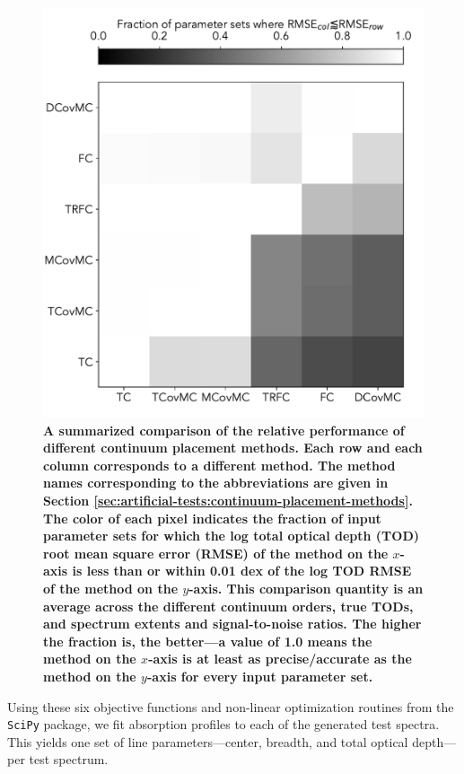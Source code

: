 \documentclass[trackchanges]{aastex62}
\begin{document}
{\begin{figure}
  \includegraphics[width=\linewidth]{figures/overall-performance.pdf}
  \caption{
  \bf \color{red}
  A summarized comparison of the relative performance of different continuum placement methods.
  Each row and each column corresponds to a different method.
  The method names corresponding to the abbreviations are given in Section \ref{sec:artificial-tests:continuum-placement-methods}.
  The color of each pixel indicates the fraction of input parameter sets for which the log total optical depth (TOD) root mean square error (RMSE) of the method on the $x$-axis is less than or within 0.01 dex of the log TOD RMSE of the method on the $y$-axis.
  This comparison quantity is an average across the different continuum orders, true TODs, and spectrum extents and signal-to-noise ratios.
  The higher the fraction is, the better---a value of 1.0 means the method on the $x$-axis is at least as precise/accurate as the method on the $y$-axis for every input parameter set.
  }
  \label{fig:outcomes-summary}
\end{figure}
Using these six objective functions and non-linear optimization routines from the \texttt{SciPy} package, we fit absorption profiles to each of the generated test spectra.
This yields one set of line parameters---center, breadth, and total optical depth---per test spectrum.
}
\end{document}

